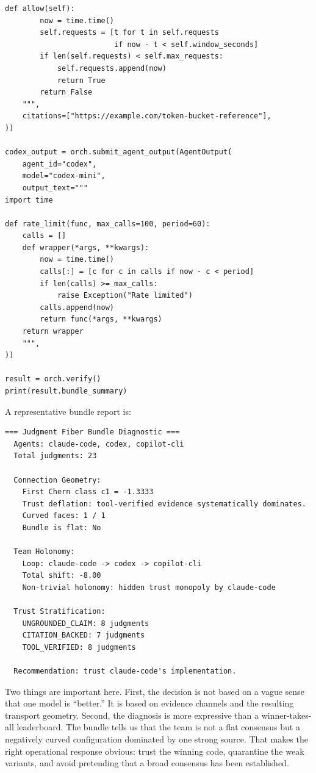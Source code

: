 \documentclass[11pt]{article}
\begin{document}
\begin{lstlisting}[style=jugeo-python,caption={Competitive coding with three agent CLIs.},label={lst:coding-agents}]
    def allow(self):
        now = time.time()
        self.requests = [t for t in self.requests
                         if now - t < self.window_seconds]
        if len(self.requests) < self.max_requests:
            self.requests.append(now)
            return True
        return False
    """,
    citations=["https://example.com/token-bucket-reference"],
))

codex_output = orch.submit_agent_output(AgentOutput(
    agent_id="codex",
    model="codex-mini",
    output_text="""
import time

def rate_limit(func, max_calls=100, period=60):
    calls = []
    def wrapper(*args, **kwargs):
        now = time.time()
        calls[:] = [c for c in calls if now - c < period]
        if len(calls) >= max_calls:
            raise Exception("Rate limited")
        calls.append(now)
        return func(*args, **kwargs)
    return wrapper
    """,
))

result = orch.verify()
print(result.bundle_summary)
\end{lstlisting}

A representative bundle report is:
\begin{lstlisting}[style=jugeo-python,caption={Representative bundle diagnostic from the coding-agents example.}]
=== Judgment Fiber Bundle Diagnostic ===
  Agents: claude-code, codex, copilot-cli
  Total judgments: 23

  Connection Geometry:
    First Chern class c1 = -1.3333
    Trust deflation: tool-verified evidence systematically dominates.
    Curved faces: 1 / 1
    Bundle is flat: No

  Team Holonomy:
    Loop: claude-code -> codex -> copilot-cli
    Total shift: -8.00
    Non-trivial holonomy: hidden trust monopoly by claude-code

  Trust Stratification:
    UNGROUNDED_CLAIM: 8 judgments
    CITATION_BACKED: 7 judgments
    TOOL_VERIFIED: 8 judgments

  Recommendation: trust claude-code's implementation.
\end{lstlisting}

Two things are important here.  First, the decision is not based on a vague
sense that one model is ``better.''  It is based on evidence channels and the
resulting transport geometry.  Second, the diagnosis is more expressive than a
winner-takes-all leaderboard.  The bundle tells us that the team is not a flat
consensus but a negatively curved configuration dominated by one strong source.
That makes the right operational response obvious: trust the winning code,
quarantine the weak variants, and avoid pretending that a broad consensus has
been established.
\end{document}
